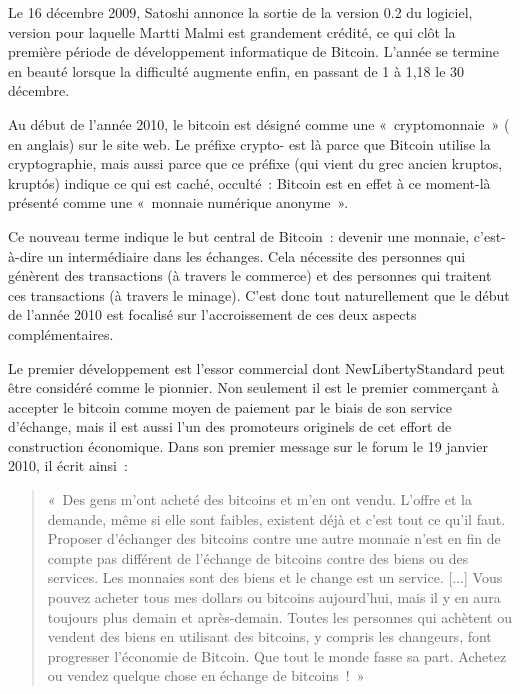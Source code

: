Le 16 décembre 2009, Satoshi annonce la sortie de la version 0.2 du logiciel, version pour laquelle Martti Malmi est grandement crédité, ce qui clôt la première période de développement informatique de Bitcoin. L'année se termine en beauté lorsque la difficulté augmente enfin, en passant de 1 à 1,18 le 30 décembre.

Au début de l'année 2010, le bitcoin est désigné comme une «~cryptomonnaie~» ( en anglais) sur le site web. Le préfixe crypto- est là parce que Bitcoin utilise la cryptographie, mais aussi parce que ce préfixe (qui vient du grec ancien \foreignlanguage{greek}{kruptos}, kruptós) indique ce qui est caché, occulté~: Bitcoin est en effet à ce moment-là présenté comme une «~monnaie numérique anonyme~».

Ce nouveau terme indique le but central de Bitcoin~: devenir une monnaie, c'est-à-dire un intermédiaire dans les échanges. Cela nécessite des personnes qui génèrent des transactions (à travers le commerce) et des personnes qui traitent ces transactions (à travers le minage). C'est donc tout naturellement que le début de l'année 2010 est focalisé sur l'accroissement de ces deux aspects complémentaires.



Le premier développement est l'essor commercial dont NewLibertyStandard peut être considéré comme le pionnier. Non seulement il est le premier commerçant à accepter le bitcoin comme moyen de paiement par le biais de son service d'échange, mais il est aussi l'un des promoteurs originels de cet effort de construction économique. Dans son premier message sur le forum le 19 janvier 2010, il écrit ainsi~:

\begin{quote}
«~Des gens m'ont acheté des bitcoins et m'en ont vendu. L'offre et la demande, même si elle sont faibles, existent déjà et c'est tout ce qu'il faut. Proposer d'échanger des bitcoins contre une autre monnaie n'est en fin de compte pas différent de l'échange de bitcoins contre des biens ou des services. Les monnaies sont des biens et le change est un service. [...] Vous pouvez acheter tous mes dollars ou bitcoins aujourd'hui, mais il y en aura toujours plus demain et après-demain. Toutes les personnes qui achètent ou vendent des biens en utilisant des bitcoins, y compris les changeurs, font progresser l'économie de Bitcoin. Que tout le monde fasse sa part. Achetez ou vendez quelque chose en échange de bitcoins~!~»
\end{quote}

